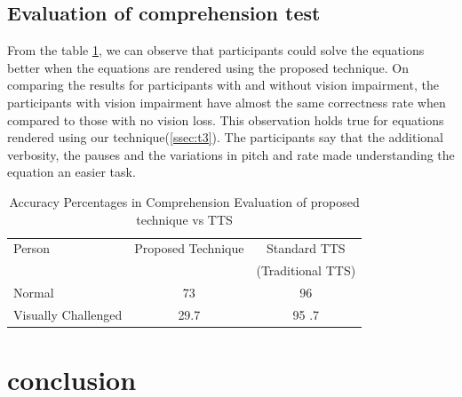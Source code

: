 \documentclass{article}
\begin{document}
\subsection{Evaluation of comprehension test}
\label{ssec:results}

From the table \ref{table:comprehension}, we can observe that participants could solve the equations better when the equations are rendered using the proposed technique. On comparing the results for participants with and without vision impairment, the participants with vision impairment have almost the same correctness rate when compared to those with no vision loss. This observation holds true for equations rendered using our technique(\ref{ssec:t3}). The participants say that the additional verbosity, the pauses and the variations in pitch and rate made understanding the equation an easier task.

\begin{table}[h]
\label{table:comprehension}
\caption{ Accuracy Percentages in Comprehension Evaluation of proposed technique vs TTS}

\vspace{8pt} %

\centering
\begin{tabular}{|l |c |c|}
\hline%
Person & Proposed Technique & Standard TTS  \\
                  &              & (Traditional TTS) \\[0.5ex]
\hline

Normal & 73 & 96 \\
\hline
Visually Challenged & 29.7 & 95 .7 \\
\hline

\hline



\end{tabular}
\end{table}



\section{conclusion}
\label{sec:conclusion}
\end{document}

